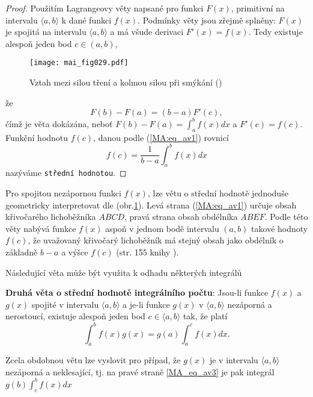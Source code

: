   \begin{proof} Použitím Lagrangeovy věty napsané pro funkci $F(x)$, primitivní na intervalu
    $\langle a, b\rangle$ k dané funkci $f(x)$. Podmínky věty jsou zřejmě splněny: $F(x)$ je
    spojitá na intervalu $\langle a, b\rangle$ a má všude derivaci $F'(x)= f(x)$. Tedy existuje
    alespoň jeden bod $c\in(a, b)$,
    
    \begin{figure}[ht!]  %
      \centering
      \texttt{[image: mai\_fig029.pdf]}
      \caption{Vztah mezi silou tření a kolmou silou při smýkání
              (\cite[s.~173]{Feynman01})}
      \label{mai:fig029}
    \end{figure}

     že $$F(b)-F(a) = (b-a)F'(c),$$ čímž je věta dokázána, neboť $F(b)-F(a) = \int_a^bf(x)dx$ a
     $F'(c) = f(c)$. Funkční hodnotu $f(c)$, danou podle (\ref{MA:eq_av1}) rovnicí  
     \begin{equation}\label{MA:eq_av2}
        f(c) = \frac{1}{b-a}\int_a^b f(x)dx
     \end{equation}
     nazýváme \texttt{střední hodnotou}.
  \end{proof}

  Pro spojitou nezápornou funkci $f(x)$, lze větu o střední hodnotě jednoduše geometricky
  interpretovat dle (obr.\ref{mai:fig029}). Levá strana (\ref{MA:eq_av1}) určuje obsah
  křivočarého lichoběžníka $ABCD$, pravá strana obsah obdélníka $ABEF$. Podle této věty nabývá
  funkce $f(x)$ aspoň v jednom bodě intervalu $(a, b)$ takové hodnoty $f(c)$, že uvažovaný
  křivočarý lichoběžník má stejný obsah jako obdélník o základně $b-a$ a výšce $f(c)$ (str. 155
  knihy \cite{Knichal}).

  

  

  Následující věta může být využita k odhadu některých integrálů
  \begin{lemma}
    \textbf{Druhá věta o střední hodnotě integrálního počtu}: Jsou-li funkce $f(x)$ a $g(x)$
    spojité v intervalu $\langle a, b \rangle$ a je-li funkce $g(x)$ v $\langle a, b \rangle$
    nezáporná a nerostoucí, existuje alespoň jeden bod $c\in\langle a, b \rangle$ tak, že platí
    \begin{equation}\label{MA_eq_av3}
        \int_a^b f(x)g(x) = g(a)\int_a^c f(x)dx.
    \end{equation}
  \end{lemma}
  Zcela obdobnou větu lze vyslovit pro případ, že $g(x)$ je v intervalu $\langle a, b \rangle$
  nezáporná a neklesající, tj. na pravé straně \ref{MA_eq_av3} je pak integrál $g(b)\int_c^b
  f(x)dx$

